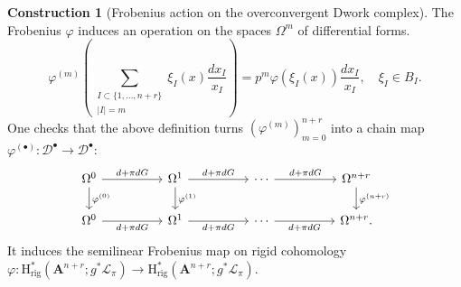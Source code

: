 \documentclass{amsart}
\numberwithin{equation}{section}
\theoremstyle{plain}
\theoremstyle{definition}
\newtheorem{construction}[equation]{Construction}
\renewcommand{\mathbb}{\mathbf}
\begin{document}
\begin{construction}[Frobenius action on the overconvergent Dwork complex]
The Frobenius \(\varphi\) induces an operation on the spaces
\(\Omega^{m}\) of differential forms.
\begin{equation*}
\varphi^{(m)}\left(\sum_{\substack{I\subset\{1,\ldots,n+r\}\\|I|=m}}\xi_{I}(x) \frac{dx_I}{x_{I}}\right)
= p^{m}\varphi(\xi_{I}(x))\frac{dx_{I}}{x_{I}},\quad \xi_I \in B_{I}.
\end{equation*}
One checks that the above definition turns
\((\varphi^{(m)})_{m=0}^{n+r}\) into a chain map \(\varphi^{(\bullet)}\colon \mathcal{D}^{\bullet} \to \mathcal{D}^{\bullet}\):
\begin{equation*}
\begin{tikzcd}
\Omega^{0} \ar[rr,"d + \pi dG"] \ar[d,"\varphi^{(0)}"] & &  \Omega^{1} \ar[rr,"d + \pi dG"] \ar[d,"\varphi^{(1)}"]& &  \cdots \ar[rr,"d + \pi dG"] & &  \Omega^{n+r} \ar[d,"\varphi^{(n+r)}"] \\
\Omega^{0} \ar[rr,swap,"d + \pi dG"] & &  \Omega^{1} \ar[rr,swap,"d + \pi dG"] & &  \cdots \ar[rr,swap,"d + \pi dG"] & &  \Omega^{n+r}.
\end{tikzcd}
\end{equation*}
It induces the semilinear Frobenius map on rigid cohomology
\(\varphi\colon\mathrm{H}^{\ast}_{\mathrm{rig}}(\mathbb{A}^{n+r};g^{\ast}\mathcal{L}_{\pi})\to\mathrm{H}^{\ast}_{\mathrm{rig}}(\mathbb{A}^{n+r};g^{\ast}\mathcal{L}_{\pi})\).
\end{construction}
\end{document}
